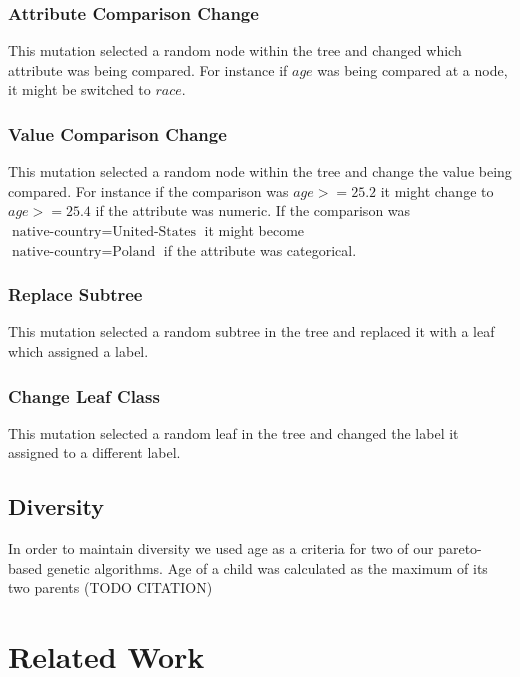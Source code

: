 \documentclass{acm_proc_article-sp}
\begin{document}
\subsubsection{Attribute Comparison Change}

This mutation selected a random node within the tree and changed which attribute was being compared. For instance if $age$ was being compared at a node, it might be switched to $race$.

\subsubsection{Value Comparison Change}

This mutation selected a random node within the tree and change the value being compared. For instance if the comparison was $age>=25.2$ it might change to $age>=25.4$ if the attribute was numeric. If the comparison was \\ $\text{native-country} = \text{United-States}$ it might become \\ $\text{native-country} = \text{Poland}$ if the attribute was categorical.

\subsubsection{Replace Subtree}

This mutation selected a random subtree in the tree and replaced it with a leaf which assigned a label.

\subsubsection{Change Leaf Class}

This mutation selected a random leaf in the tree and changed the label it assigned to a different label.

\subsection{Diversity}

In order to maintain diversity we used age as a criteria for two of our pareto-based genetic algorithms. Age of a child was calculated as the maximum of its two parents (TODO CITATION)

\section{Related Work}
\end{document}

